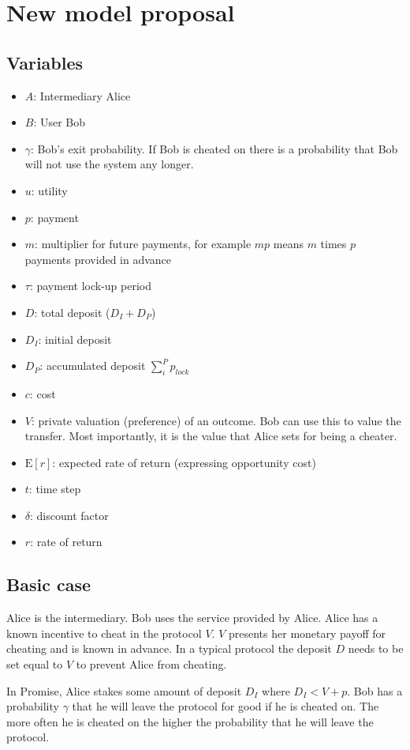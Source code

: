 \documentclass[runningheads]{llncs}
\newcommand{\sys}{Promise\xspace}
\begin{document}
\section{New model proposal}
\subsection{Variables}
\begin{itemize}
    \item $A$: Intermediary Alice
    \item $B$: User Bob
    \item $\gamma$: Bob's exit probability. If Bob is cheated on there is a probability that Bob will not use the system any longer.
    \item $u$: utility
    \item $p$: payment
    \item $m$: multiplier for future payments, for example $mp$ means $m$ times $p$ payments provided in advance
    \item $\tau$: payment lock-up period
    \item $D$: total deposit ($D_I + D_P$)
    \item $D_I$: initial deposit
    \item $D_P$: accumulated deposit $\sum_i^{P} p_{lock}$
    \item $c$: cost
    \item $V$: private valuation (preference) of an outcome. Bob can use this to value the transfer. Most importantly, it is the value that Alice sets for being a cheater.
    \item $\mathrm{E}[r]$: expected rate of return (expressing opportunity cost)
    \item $t$: time step
    \item $\delta$: discount factor
    \item $r$: rate of return
\end{itemize}

\subsection{Basic case}
Alice is the intermediary.
Bob uses the service provided by Alice.
Alice has a known incentive to cheat in the protocol $V$.
$V$ presents her monetary payoff for cheating and is known in advance.
In a typical protocol the deposit $D$ needs to be set equal to $V$ to prevent Alice from cheating.

In \sys, Alice stakes some amount of deposit $D_I$ where $D_I < V + p$.
Bob has a probability $\gamma$ that he will leave the protocol for good if he is cheated on.
The more often he is cheated on the higher the probability that he will leave the protocol.
\end{document}

